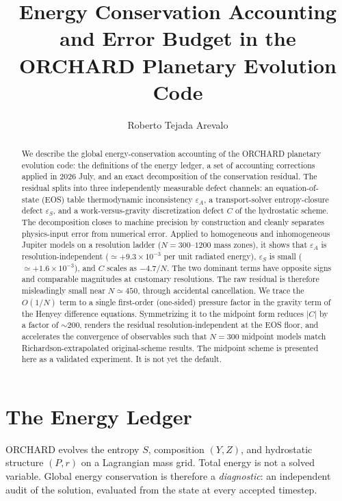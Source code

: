 \documentclass{aastex631}
\newcommand{\epsA}{\varepsilon_A}
\newcommand{\epsS}{\varepsilon_S}
\begin{document}
\title{Energy Conservation Accounting and Error Budget in the ORCHARD Planetary Evolution Code}

\author{Roberto Tejada Arevalo}

\begin{abstract}
We describe the global energy-conservation accounting of the ORCHARD
planetary evolution code: the definitions of the energy ledger, a set of
accounting corrections applied in 2026 July, and an exact decomposition of
the conservation residual.  The residual splits into three independently
measurable defect channels: an equation-of-state (EOS) table thermodynamic
inconsistency $\epsA$, a transport-solver entropy-closure defect $\epsS$,
and a work-versus-gravity discretization defect $C$ of the hydrostatic
scheme.  The decomposition closes to machine precision by construction and
cleanly separates physics-input error from numerical error.  Applied to
homogeneous and inhomogeneous Jupiter models on a resolution ladder
($N=300$--$1200$ mass zones), it shows that $\epsA$ is
resolution-independent ($\simeq +9.3\times10^{-3}$ per unit radiated
energy), $\epsS$ is small ($\simeq +1.6\times10^{-3}$), and $C$ scales as
$-4.7/N$.  The two dominant
terms have opposite signs and comparable magnitudes at customary
resolutions.  The raw residual is therefore misleadingly small near
$N\simeq450$, through accidental cancellation.  We trace the $O(1/N)$ term
to a single first-order (one-sided) pressure factor in the gravity term of
the Henyey difference equations.  Symmetrizing it to the midpoint form
reduces $|C|$ by a factor of $\sim$200, renders the residual
resolution-independent at the EOS floor, and accelerates the convergence
of observables such that $N=300$ midpoint models match
Richardson-extrapolated original-scheme results.  The midpoint scheme is
presented here as a validated experiment.  It is not yet the default.
\end{abstract}

\section{The Energy Ledger}
\label{sec:ledger}

ORCHARD evolves the entropy $S$, composition $(Y,Z)$, and hydrostatic
structure $(P,r)$ on a Lagrangian mass grid.  Total energy is not a solved
variable.  Global energy conservation is therefore a \emph{diagnostic}: an
independent audit of the solution, evaluated from the state at every
accepted timestep.
\end{document}
